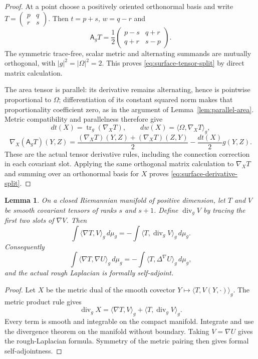 \documentclass[11pt]{article}
\newtheorem{lemma}[theorem]{Lemma}
\begin{document}
\begin{proof}
At a point choose a positively oriented orthonormal basis and write
$T=\left(\begin{smallmatrix}p&q\\r&s\end{smallmatrix}\right)$.
Then $t=p+s$, $w=q-r$ and
\[
 \mathsf A_gT=\frac12
 \begin{pmatrix}p-s&q+r\\q+r&s-p\end{pmatrix}.
\]
The symmetric trace-free, scalar metric and alternating summands are mutually
orthogonal, with $|g|^2=|\Omega|^2=2$. This proves
\eqref{eq:surface-tensor-split} by direct matrix calculation.

The area tensor is parallel: its derivative remains alternating, hence is
pointwise proportional to $\Omega$; differentiation of its constant squared
norm makes that proportionality coefficient zero, as in the argument of
Lemma~\ref{lem:parallel-area}. Metric compatibility and parallelness therefore give
\[
 dt(X)=\operatorname{tr}_g(\nabla_XT),\qquad
 dw(X)=\langle\Omega,\nabla_XT\rangle_g,
\]
\[
 \nabla_X(\mathsf A_gT)(Y,Z)=
 \frac{(\nabla_XT)(Y,Z)+(\nabla_XT)(Z,Y)}2
       -\frac{dt(X)}2g(Y,Z).
\]
These are the actual tensor derivative rules, including the connection
correction in each covariant slot. Applying the same orthogonal matrix
calculation to $\nabla_XT$ and summing over an orthonormal basis for $X$
proves \eqref{eq:surface-derivative-split}.
\end{proof}

\begin{lemma}\label{lem:canonical-tensor-green}
On a closed Riemannian manifold of positive dimension, let $T$ and $V$ be
smooth covariant tensors of ranks $s$ and $s+1$. Define $\operatorname{div}_gV$
by tracing the first two slots of $\nabla V$. Then
\[
 \int\langle\nabla T,V\rangle_g\,d\mu_g
       =-\int\langle T,\operatorname{div}_gV\rangle_g\,d\mu_g.
\]
Consequently
\[
 \int\langle\nabla T,\nabla U\rangle_g\,d\mu_g
       =-\int\langle T,\Delta^\nabla U\rangle_g\,d\mu_g,
\]
and the actual rough Laplacian is formally self-adjoint.
\end{lemma}

\begin{proof}
Let $X$ be the metric dual of the smooth covector
$Y\mapsto\langle T,V(Y,\cdot)\rangle_g$.
The metric product rule gives
\[
 \operatorname{div}_gX=
       \langle\nabla T,V\rangle_g+
       \langle T,\operatorname{div}_gV\rangle_g.
\]
Every term is smooth and integrable on the compact manifold. Integrate and
use the divergence theorem on the manifold without boundary.
Taking $V=\nabla U$ gives the rough-Laplacian formula. Symmetry of the
metric pairing then gives formal self-adjointness.
\end{proof}
\end{document}
